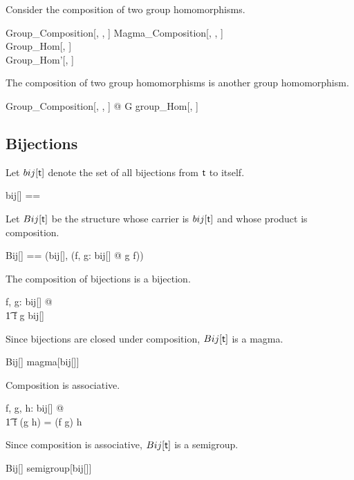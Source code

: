 \documentclass{amsart}
\begin{document}
Consider the composition of two group homomorphisms.

\begin{schema}{Group\_Composition}[\genT, \genU, \genV]
	Magma\_Composition[\genT, \genU, \genV] \\
	Group\_Hom[\genT, \genU] \\
	Group\_Hom'[\genU, \genV]
\end{schema}

\begin{remark}
The composition of two group homomorphisms is another group homomorphism.

\begin{zed}
	\forall Group\_Composition[\setT, \setU, \setV] @ G \in group\_Hom[\setT, \setV]
\end{zed}

\end{remark}

\subsection{Bijections}

Let $bij[\mathsf{t}]$ denote the set of all bijections from $\mathsf{t}$ to itself.

\begin{zed}
	bij[\genT] == \genT \bij \genT
\end{zed}

Let $Bij[\mathsf{t}]$ be the structure whose carrier is $bij[\mathsf{t}]$ and
whose product is composition.

\begin{zed}
	Bij[\genT] == (bij[\genT], (\lambda f, g: bij[\genT] @ g \circ f))
\end{zed}

\begin{remark}
The composition of bijections is a bijection.

\begin{zed}
	\forall f, g: bij[\setT] @ \\
	\t1	f \circ g \in bij[\setT]
\end{zed}

Since bijections are closed under composition, $Bij[\mathsf{t}]$ is a magma.

\begin{zed}
	Bij[\setT] \in magma[bij[\setT]]
\end{zed}
	
\end{remark}

\begin{remark}
Composition is associative.

\begin{zed}
	\forall f, g, h: bij[\setT] @ \\
	\t1	f \circ (g \circ h) = (f \circ g) \circ h
\end{zed}

Since composition is associative, $Bij[\mathsf{t}]$ is a semigroup.

\begin{zed}
	Bij[\setT] \in semigroup[bij[\setT]]
\end{zed}

\end{remark}
\end{document}
